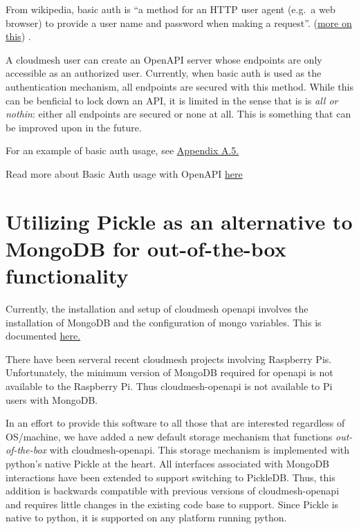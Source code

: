 From wikipedia, basic auth is ``a method for an HTTP user agent (e.g.~a
web browser) to provide a user name and password when making a
request''. (\href{https://github.com/cloudmesh/cloudmesh-openapi}{more
on this}) \cite{cloudmesh-openapi}.

A cloudmesh user can create an OpenAPI server whose endpoints are only
accessible as an authorized user. Currently, when basic auth is used as
the authentication mechanism, all endpoints are secured with this
method. While this can be benficial to lock down an API, it is limited
in the sense that is is {\em all or nothin}: either all endpoints are
secured or none at all. This is something that can be improved upon in
the future.

For an example of basic auth usage, see
\protect\hyperlink{a5-basic-auth-example}{Appendix A.5.}

Read more about Basic Auth usage with OpenAPI
\href{https://swagger.io/docs/specification/authentication/basic-authentication/}{here}

\section{Utilizing Pickle as an alternative to MongoDB for
  out-of-the-box
  functionality}\label{utilizing-pickle-as-an-alternative-to-mongodb-for-out-of-the-box-functionality}

Currently, the installation and setup of cloudmesh openapi involves the
installation of MongoDB and the configuration of mongo variables. This
is documented
\href{https://github.com/cloudmesh/cloudmesh-openapi\#installation}{here.}

There have been serveral recent cloudmesh projects involving Raspberry
Pis. Unfortunately, the minimum version of MongoDB required for openapi
is not available to the Raspberry Pi. Thus cloudmesh-openapi is not
available to Pi users with MongoDB.

In an effort to provide this software to all those that are interested
regardless of OS/machine, we have added a new default storage mechanism
that functions {\em out-of-the-box} with cloudmesh-openapi. This storage
mechanism is implemented with python's native Pickle at the heart. All
interfaces associated with MongoDB interactions have been extended to
support switching to PickleDB. Thus, this addition is backwards
compatible with previous versions of cloudmesh-openapi and requires
little changes in the existing code base to support. Since Pickle is
native to python, it is supported on any platform running python.

